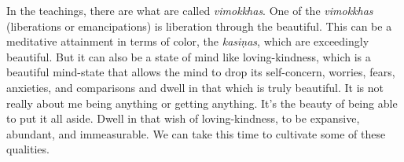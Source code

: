 In the teachings, there are what are called \emph{vimokkhas}. One of the
\emph{vimokkhas} (liberations or emancipations) is liberation through
the beautiful. This can be a meditative attainment in terms of color,
the \emph{kasiṇas}, which are exceedingly beautiful. But it can also be
a state of mind like loving-kindness, which is a beautiful mind-state
that allows the mind to drop its self-concern, worries, fears,
anxieties, and comparisons and dwell in that which is truly beautiful.
It is not really about me being anything or getting anything. It’s the
beauty of being able to put it all aside. Dwell in that wish of
loving-kindness, to be expansive, abundant, and immeasurable. We can
take this time to cultivate some of these qualities.
